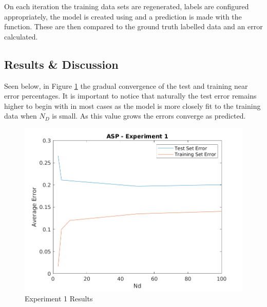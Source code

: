 On each iteration the training data sets are regenerated, labels are configured appropriately, the model is created using  and a prediction is made with the  function. These are then compared to the ground truth labelled data and an error calculated.

\pagebreak
\subsection{Results \& Discussion}
Seen below, in Figure \ref{fig:exp1} the gradual convergence of the test and training near error percentages. It is important to notice that naturally the test error remains higher to begin with in most cases as the model is more closely fit to the training data when $N_{D}$ is small. As this value grows the errors converge as predicted.

\begin{figure}[H]
	\centering
	\includegraphics[width=.6\linewidth]{./code/Exp1-results/10iters/ErrorComparison.png}
	\caption{Experiment 1 Results}
	\label{fig:exp1}
\end{figure}

